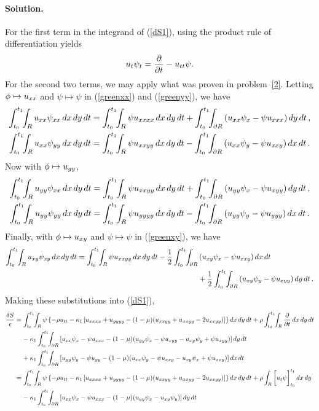 \documentclass[11pt]{article}
\newcommand{\refeq}[1]{(\ref{#1})}
\newcommand{\beq}{\begin{equation*}}
\newcommand{\eeq}{\end{equation*}}
\newenvironment{solution}
{
    \paragraph{Solution.}
    \ignorespaces
}
{
}
\begin{document}
\begin{solution}
	For the first term in the integrand of \refeq{dS1}, using the product rule of differentiation yields
	\beq
		\ut \psit = \pdv{}{t} (\ut \psi) - \utt \psi.
	\eeq
	For the second two terms, we may apply what was proven in problem~\ref{2}.  Letting $\phi \mapsto u_{xx}$ and $\psi \mapsto \psi$ in \refeq{greenxx} and \refeq{greenyy}, we have
	\begin{align*}
		\inttr \uxx \psixx \drt &= \inttr \psi \uxxxx \drt + \inttdr \left( \uxx \psix - \psi \uxxx \right) \dd{y} \dd{t}, \\
		\inttr \uxx \psiyy \drt &= \inttr \psi \uxxyy \drt - \inttdr \left( \uxx \psiy - \psi \uxxy \right) \dd{x} \dd{t}.
	\end{align*}
	Now with $\phi \mapsto u_{yy}$,
	\begin{align*}
		\inttr \uyy \psixx \drt &= \inttr \psi \uxxyy \drt + \inttdr \left( \uyy \psix - \psi \uxyy \right) \dd{y} \dd{t}, \\
		\inttr \uyy \psiyy \drt &= \inttr \psi \uyyyy \drt - \inttdr \left( \uyy \psiy - \psi \uyyy \right) \dd{x} \dd{t}.
	\end{align*}
	Finally, with $\phi \mapsto u_{xy}$ and $\psi \mapsto \psi$ in \refeq{greenxy}, we have
	\begin{align*}
		\inttr \uxy \psixy \drt = \inttr \psi \uxxyy \drt - \frac{1}{2} \inttdr &\left( \uxy \psix - \psi \uxxy \right) \dd{x} \dd{t} \\
		&+ \frac{1}{2} \inttdr \left( \uxy \psiy - \psi \uxyy \right) \dd{y} \dd{t}.
	\end{align*}
	Making these substitutions into \refeq{dS1},
	\begin{align*}
		\frac{\dS}{\eps} &= \inttr \psi \left\{ -\rho \utt - \kaq \left[ \uxxxx + \uyyyy - (1 - \mu) (\uxxyy + \uxxyy - 2 \uxxyy) \right] \right\} \drt + \rho \inttr \pdv{}{t} (\ut \psi) \drt \notag \\
		&\phantom{=\ }- \kaq \inttdr \left[ \uxx \psix - \psi \uxxx - (1 - \mu) (\uyy \psix - \psi \uxyy - \uxy \psiy + \psi \uxyy) \right] \dd{y} \dd{t} \notag \\
		&\phantom{=\ } + \kaq \inttdr \left[ \uyy \psiy - \psi \uyy - (1 - \mu) (\uxx \psiy - \psi \uxxy - \uxy \psix + \psi \uxxy) \right] \dd{x} \dd{t} \\
		&= \inttr \psi \left\{ -\rho \utt - \kaq \left[ \uxxxx + \uyyyy - (1 - \mu) (\uxxyy + \uxxyy - 2 \uxxyy) \right] \right\} \drt + \rho \intr \bigg[\ut \psi\bigg]_{t_0}^{t_1} \dd{x} \dd{y} \\
		&\phantom{=\ } - \kaq \inttdr \left[ \uxx \psix - \psi \uxxx - (1 - \mu) (\uyy \psix - \uxy \psiy) \right] \dd{y} \dd{t} \\

\end{align*}
\end{solution}
\end{document}
